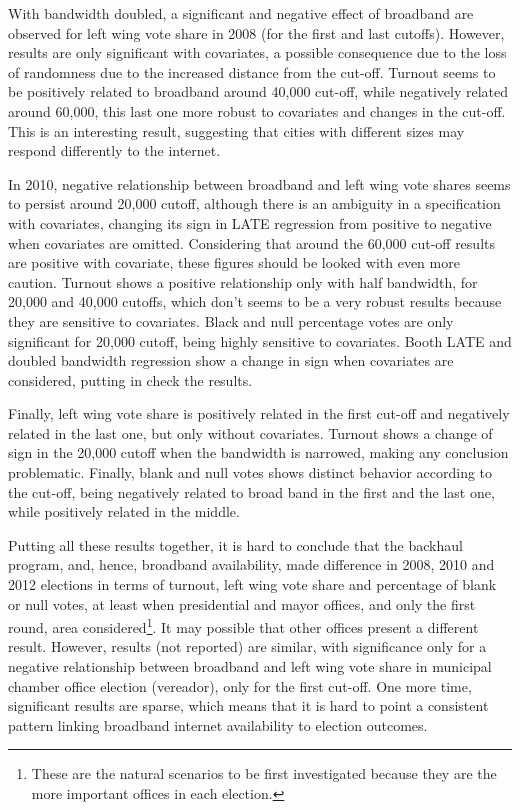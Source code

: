 \documentclass[12pt,]{article}
\let\rmarkdownfootnote\footnote%
\def\footnote{\protect\rmarkdownfootnote}
\begin{document}
With bandwidth doubled, a significant and negative effect of broadband
are observed for left wing vote share in 2008 (for the first and last
cutoffs). However, results are only significant with covariates, a
possible consequence due to the loss of randomness due to the increased
distance from the cut-off. Turnout seems to be positively related to
broadband around 40,000 cut-off, while negatively related around 60,000,
this last one more robust to covariates and changes in the cut-off. This
is an interesting result, suggesting that cities with different sizes
may respond differently to the internet.

In 2010, negative relationship between broadband and left wing vote
shares seems to persist around 20,000 cutoff, although there is an
ambiguity in a specification with covariates, changing its sign in LATE
regression from positive to negative when covariates are omitted.
Considering that around the 60,000 cut-off results are positive with
covariate, these figures should be looked with even more caution.
Turnout shows a positive relationship only with half bandwidth, for
20,000 and 40,000 cutoffs, which don't seems to be a very robust results
because they are sensitive to covariates. Black and null percentage
votes are only significant for 20,000 cutoff, being highly sensitive to
covariates. Booth LATE and doubled bandwidth regression show a change in
sign when covariates are considered, putting in check the results.

Finally, left wing vote share is positively related in the first cut-off
and negatively related in the last one, but only without covariates.
Turnout shows a change of sign in the 20,000 cutoff when the bandwidth
is narrowed, making any conclusion problematic. Finally, blank and null
votes shows distinct behavior according to the cut-off, being negatively
related to broad band in the first and the last one, while positively
related in the middle.

Putting all these results together, it is hard to conclude that the
backhaul program, and, hence, broadband availability, made difference in
2008, 2010 and 2012 elections in terms of turnout, left wing vote share
and percentage of blank or null votes, at least when presidential and
mayor offices, and only the first round, area considered\footnote{These
  are the natural scenarios to be first investigated because they are
  the more important offices in each election.}. It may possible that
other offices present a different result. However, results (not
reported) are similar, with significance only for a negative
relationship between broadband and left wing vote share in municipal
chamber office election (vereador), only for the first cut-off. One more
time, significant results are sparse, which means that it is hard to
point a consistent pattern linking broadband internet availability to
election outcomes.
\end{document}
